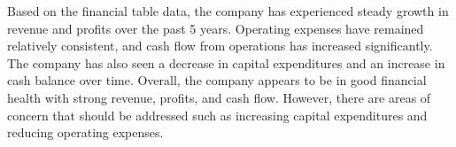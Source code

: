 

Based on the financial table data, the company has experienced steady growth in revenue and profits over the past 5 years. Operating expenses have remained relatively consistent, and cash flow from operations has increased significantly. The company has also seen a decrease in capital expenditures and an increase in cash balance over time. Overall, the company appears to be in good financial health with strong revenue, profits, and cash flow. However, there are areas of concern that should be addressed such as increasing capital expenditures and reducing operating expenses.